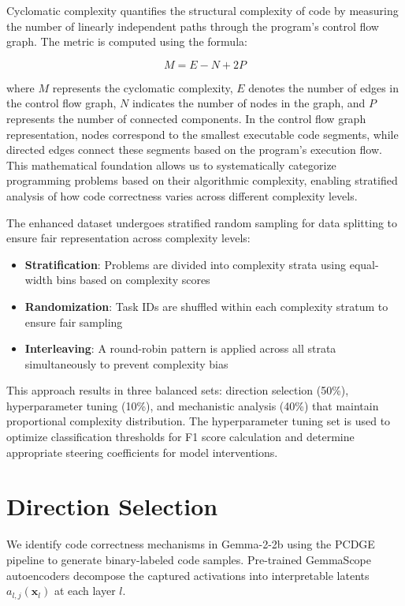 Cyclomatic complexity quantifies the structural complexity of code by measuring the number of linearly independent paths through the program's control flow graph. The metric is computed using the formula:

\begin{equation}
M = E - N + 2P
\end{equation}

where $M$ represents the cyclomatic complexity, $E$ denotes the number of edges in the control flow graph, $N$ indicates the number of nodes in the graph, and $P$ represents the number of connected components. In the control flow graph representation, nodes correspond to the smallest executable code segments, while directed edges connect these segments based on the program's execution flow. This mathematical foundation allows us to systematically categorize programming problems based on their algorithmic complexity, enabling stratified analysis of how code correctness varies across different complexity levels.

The enhanced dataset undergoes stratified random sampling for data splitting to ensure fair representation across complexity levels:

\begin{itemize}
    \item \textbf{Stratification}: Problems are divided into complexity strata using equal-width bins based on complexity scores
    \item \textbf{Randomization}: Task IDs are shuffled within each complexity stratum to ensure fair sampling
    \item \textbf{Interleaving}: A round-robin pattern is applied across all strata simultaneously to prevent complexity bias
\end{itemize}

This approach results in three balanced sets: direction selection (50\%), hyperparameter tuning (10\%), and mechanistic analysis (40\%) that maintain proportional complexity distribution. The hyperparameter tuning set is used to optimize classification thresholds for F1 score calculation and determine appropriate steering coefficients for model interventions.

\section{Direction Selection}

We identify code correctness mechanisms in Gemma-2-2b using the PCDGE pipeline to generate binary-labeled code samples. Pre-trained GemmaScope autoencoders \cite{lieberum2024gemma} decompose the captured activations into interpretable latents $a_{l,j}(\mathbf{x}_l)$ at each layer $l$.


